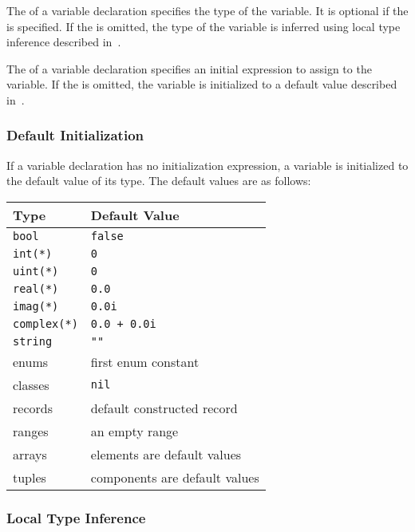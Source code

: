 The  of a variable declaration specifies the type of
the variable.  It is optional if the  is
specified.  If the  is omitted, the type of the
variable is inferred using local type inference described
in~.

The  of a variable declaration specifies an
initial expression to assign to the variable.  If
the  is omitted, the variable is initialized
to a default value described in~.

\subsubsection{Default Initialization}
\label{Default_Initialization}

If a variable declaration has no initialization expression, a variable
is initialized to the default value of its type.  The default values
are as follows:
\begin{center}
\begin{tabular}{|l|l|}
\hline
{\bf Type} & {\bf Default Value} \\
\hline
{\tt bool} & {\tt false} \\
{\tt int(*)} & {\tt 0} \\
{\tt uint(*)} & {\tt 0} \\
{\tt real(*)} & {\tt 0.0} \\
{\tt imag(*)} & {\tt 0.0i} \\
{\tt complex(*)} & {\tt 0.0 + 0.0i} \\
{\tt string} & {\tt ""} \\
enums & first enum constant \\
classes & {\tt nil} \\
records & default constructed record \\
ranges & an empty range \\
arrays & elements are default values \\
tuples & components are default values \\
\hline
\end{tabular}
\end{center}

\subsubsection{Local Type Inference}
\label{Local_Type_Inference}

